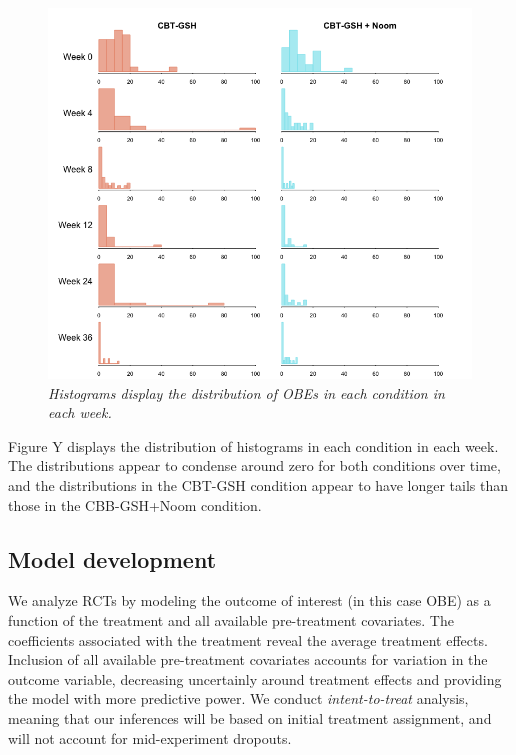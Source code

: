 \documentclass[12pt, oneside]{article}
\begin{document}
\newpage

\begin{figure}
\centering
\includegraphics[width=\textwidth, height=\textheight, keepaspectratio]{noom_hist.png}
\caption{\emph{Histograms display the distribution of OBEs in each condition in each week.}}
\end{figure}

Figure Y displays the distribution of histograms in each condition in each week.  The distributions appear to condense around zero for both conditions over time, and the distributions in the CBT-GSH condition appear to have longer tails than those in the CBB-GSH+Noom condition.  

\subsection{Model development}

We analyze RCTs by modeling the outcome of interest (in this case OBE) as a function of the treatment and all available pre-treatment covariates.  The coefficients associated with the treatment reveal the average treatment effects.  Inclusion of all available pre-treatment covariates accounts for variation in the outcome variable, decreasing uncertainly around treatment effects and providing the model with more predictive power.  We conduct \emph{intent-to-treat} analysis, meaning that our inferences will be based on initial treatment assignment, and will not account for mid-experiment dropouts.  
\\
\end{document}
